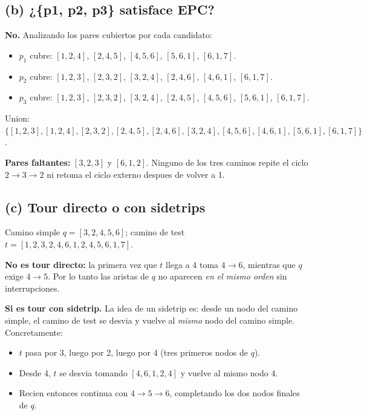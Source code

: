 \documentclass[12pt,a4paper]{article}
\begin{document}
\subsection{(b) ¿\{p1, p2, p3\} satisface EPC?}

\textbf{No.} Analizando los pares cubiertos por cada candidato:

\begin{itemize}
  \item $p_1$ cubre: $[1,2,4]$, $[2,4,5]$, $[4,5,6]$, $[5,6,1]$, $[6,1,7]$.
  \item $p_2$ cubre: $[1,2,3]$, $[2,3,2]$, $[3,2,4]$, $[2,4,6]$, $[4,6,1]$, $[6,1,7]$.
  \item $p_3$ cubre: $[1,2,3]$, $[2,3,2]$, $[3,2,4]$, $[2,4,5]$, $[4,5,6]$, $[5,6,1]$, $[6,1,7]$.
\end{itemize}

Union: $\{[1,2,3], [1,2,4], [2,3,2], [2,4,5], [2,4,6], [3,2,4], [4,5,6], [4,6,1], [5,6,1],
[6,1,7]\}$.

\textbf{Pares faltantes:} $[3,2,3]$ y $[6,1,2]$. Ninguno de los tres caminos repite el ciclo
$2 \to 3 \to 2$ ni retoma el ciclo externo despues de volver a 1.

\subsection{(c) Tour directo o con sidetrips}

Camino simple $q = [3, 2, 4, 5, 6]$; camino de test $t = [1, 2, 3, 2, 4, 6, 1, 2, 4, 5, 6, 1, 7]$.

\textbf{No es tour directo:} la primera vez que $t$ llega a 4 toma $4 \to 6$, mientras que $q$
exige $4 \to 5$. Por lo tanto las aristas de $q$ no aparecen \emph{en el mismo orden} sin
interrupciones.

\textbf{Si es tour con sidetrip.} La idea de un sidetrip es: desde un nodo del camino simple, el
camino de test se desvia y vuelve al \emph{mismo} nodo del camino simple. Concretamente:

\begin{itemize}
  \item $t$ pasa por 3, luego por 2, luego por 4 (tres primeros nodos de $q$).
  \item Desde 4, $t$ se desvia tomando $[4, 6, 1, 2, 4]$ y vuelve al mismo nodo 4.
  \item Recien entonces continua con $4 \to 5 \to 6$, completando los dos nodos finales de $q$.
\end{itemize}
\end{document}
